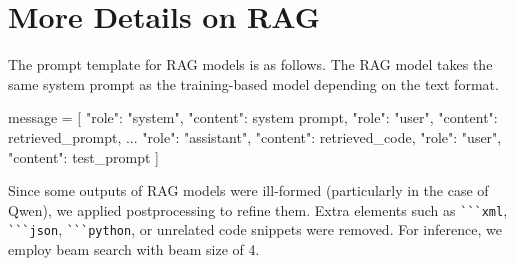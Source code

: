 \section{More Details on RAG}\label{sec:rag_details}
The prompt template for RAG models is as follows. The RAG model takes the same system prompt as the training-based model depending on the text format.

\begin{shk}
message = [
    {"role": "system", "content": {system prompt}},
    {"role": "user", "content": retrieved_prompt}, 
    ...
    {"role": "assistant", "content": retrieved_code},
    {"role": "user", "content": {test_prompt}}
]
\end{shk}
\noindent\begin{minipage}{\textwidth}
\captionsetup{type=figure}
\end{minipage}

Since some outputs of RAG models were ill-formed (particularly in the case of Qwen), we applied postprocessing to refine them. Extra elements such as \verb|```xml|, \verb|```json|, \verb|```python|, or unrelated code snippets were removed. For inference, we employ beam search with beam size of 4.
